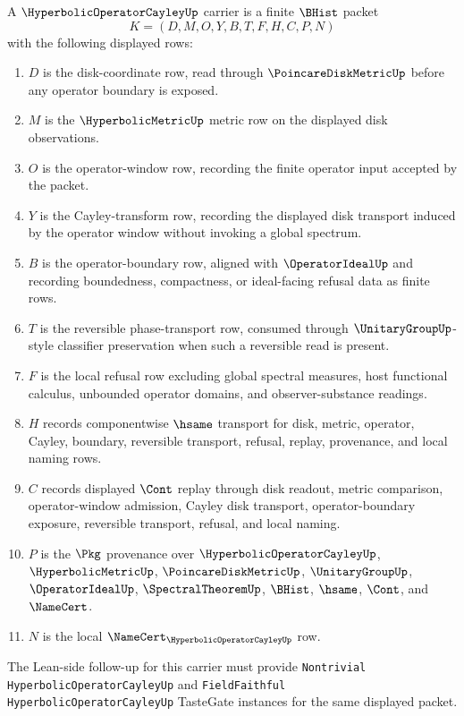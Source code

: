 \begin{definition}
\label{def:hyperbolic-operator-cayley-carrier}
A $\HyperbolicOperatorCayleyUp$ carrier is a finite $\BHist$ packet
$$
K=(D,M,O,Y,B,T,F,H,C,P,N)
$$
with the following displayed rows:
\begin{enumerate}
\item $D$ is the disk-coordinate row, read through $\PoincareDiskMetricUp$ before any operator boundary is exposed.
\item $M$ is the $\HyperbolicMetricUp$ metric row on the displayed disk observations.
\item $O$ is the operator-window row, recording the finite operator input accepted by the packet.
\item $Y$ is the Cayley-transform row, recording the displayed disk transport induced by the operator window without invoking a global spectrum.
\item $B$ is the operator-boundary row, aligned with $\OperatorIdealUp$ and recording boundedness, compactness, or ideal-facing refusal data as finite rows.
\item $T$ is the reversible phase-transport row, consumed through $\UnitaryGroupUp$-style classifier preservation when such a reversible read is present.
\item $F$ is the local refusal row excluding global spectral measures, host functional calculus, unbounded operator domains, and observer-substance readings.
\item $H$ records componentwise $\hsame$ transport for disk, metric, operator, Cayley, boundary, reversible transport, refusal, replay, provenance, and local naming rows.
\item $C$ records displayed $\Cont$ replay through disk readout, metric comparison, operator-window admission, Cayley disk transport, operator-boundary exposure, reversible transport, refusal, and local naming.
\item $P$ is the $\Pkg$ provenance over $\HyperbolicOperatorCayleyUp$, $\HyperbolicMetricUp$, $\PoincareDiskMetricUp$, $\UnitaryGroupUp$, $\OperatorIdealUp$, $\SpectralTheoremUp$, $\BHist$, $\hsame$, $\Cont$, and $\NameCert$.
\item $N$ is the local $\NameCert_{\HyperbolicOperatorCayleyUp}$ row.
\end{enumerate}
The Lean-side follow-up for this carrier must provide \texttt{Nontrivial HyperbolicOperatorCayleyUp} and \texttt{FieldFaithful HyperbolicOperatorCayleyUp} TasteGate instances for the same displayed packet.
\end{definition}


